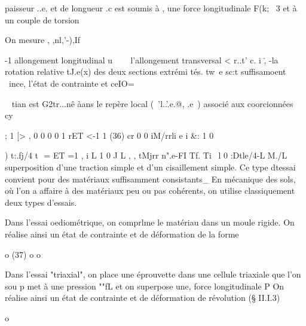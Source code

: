 {paisseur ..e. et de longueur .c est soumis à 
,­
une force longitudinale F(k; ~3 et à un couple 
de torsion 

On mesure 
, ,nl,'-),If

-1 allongement longitudinal u~~ ~ l'allongement transversal < r..t'
c. i \. , -la rotation relative tJ.e(x) des deux sections 
extrémi tés. tw~e sc:t suffisamoent ~ince, l'état de contrainte et ceIO=~­

~
tian est G2tr...nê àans le repère local (~'l..'.e.@, .e~) associé aux coorcionnées cy­

; 1 [> ,
0 0 0 0 
1 rET 
<-1 1 
(36) cr 0 0 iM/rrli e i &: 1 0 }) t:.fj/4 t  
= ET
=1 
, i 
L 1 0 J L , ,
tMjrr n".e-FI Tf. Ti~ l 0 :Dtle/4-L M./L 
superposition d'une traction simple et d'un cisaillement simple. 
Ce type dtessai convient pour des matériaux suffisamment consistants_ En mécanique des sols, où l'on a affaire à des matériaux peu ou pas cohérents, on utilise classiquement deux types d'essais. 

Dans l'essai oediométrique, on comprlme le matériau dans un moule rigide. On réalise ainsi un état de contrainte et de déformation de la forme 

o 
(37) 
o o 



Dans l'essai "triaxial", on place une éprou­vette dans une cellule triaxiale que l'on sou­
p 
met à une pression ""fL et on superpose une, force longitudinale P On réalise ainsi un état de contrainte et de déformation de révolution (§ II.I.3) 

o 

